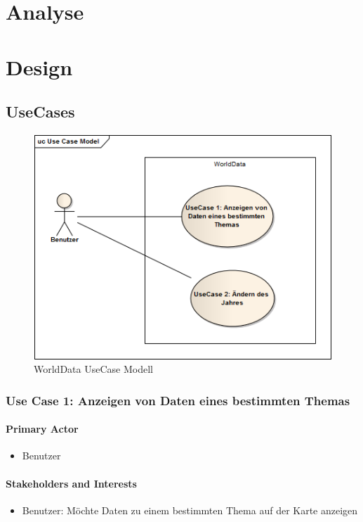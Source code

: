 \section{Analyse}

\section{Design}

\subsection{UseCases}

\begin{figure}[h!]
	\centering
	\includegraphics[scale=0.8]{images/usecase1-worlddata/uml/worlddata-usecasemodel.png}
	\caption{WorldData UseCase Modell}
	\label{worlddata-usecasemodel}
\end{figure}

\subsubsection{Use Case 1: Anzeigen von Daten eines bestimmten Themas}
\paragraph{Primary Actor}
\begin{itemize}
\item Benutzer
\end{itemize}

\paragraph{Stakeholders and Interests}
\begin{itemize}
\item Benutzer: Möchte Daten zu einem bestimmten Thema auf der Karte anzeigen
\end{itemize}

